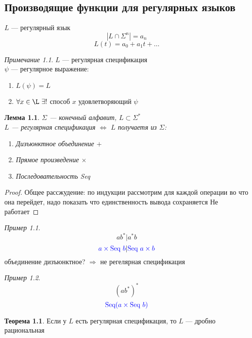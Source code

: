 \documentclass[oneside]{book}
\theoremstyle{plain}
\newtheorem{lemma}{Лемма}
\theoremstyle{remark}
\newtheorem*{remark}{Примечание}
\newtheorem*{examp}{Пример}
\theoremstyle{definition}
\newtheorem{theorem}{Теорема}[section]
\begin{document}
\chapter{}
\label{sec:orgf3c7852}
\usetikzlibrary{automata}



\section{Производящие функции для регулярных языков}
\label{sec:org73faf08}
\(L\) --- регулярный язык
\[ | L \cap \Sigma^n | = a_n \] 
\[ L(t) = a_0 + a_1 t + \dots \]
\begin{remark}
\(L\) --- регулярная спецификация \\
\(\psi\) --- регулярное выражение:
\begin{enumerate}
\item \(L(\psi) = L\)
\item \(\forall x \in \L\ \exists !\) способ \(x\) удовлетворяющий \(\psi\)
\end{enumerate}
\end{remark}
\begin{lemma}
\(\Sigma\) --- конечный алфавит, \(L \subset \Sigma^*\) \\
\(L\) --- регулярная спецификация \(\Leftrightarrow\) \(L\) получаетя из \(\Sigma\):
\begin{enumerate}
\item Дизъюнктное объединение \(+\)
\item Прямое произведение \(\times\)
\item Последовательность Seq
\end{enumerate}
\end{lemma}
\begin{proof}
Общее рассжудение: по индукции рассмотрим для каждой операции во что
она перейдет, надо показать что единственность вывода сохраняется \color{red} Не работает \color{black}
\end{proof}
\begin{examp}
\[ ab^*|a^*b \]
\[ \color{blue}a \times \text{Seq }b\color{black}|\color{blue}\text{Seq } a \times b\color{black} \]
объединение дизъюнктное? \(\Rightarrow\) не регелярная спецификация
\end{examp}
\begin{examp}
\[ (ab^*)^* \]
\[ \color{blue} \text{Seq}(a \times \text{Seq } b) \color{black} \]
\end{examp}
\begin{theorem}
Если у \(L\) есть регулярная спецификация, то \(L\) --- дробно рациональная
\end{theorem}
\end{document}
